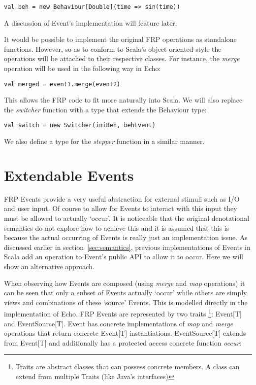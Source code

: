 \begin{verbatim}
val beh = new Behaviour[Double](time => sin(time))
\end{verbatim}  

    A discussion of Event's implementation will feature later.
    
    It would be possible to implement the original FRP operations as standalone functions. However, so
    as to conform to Scala's object oriented style the operations will be attached to their respective
    classes. For instance, the \emph{merge} operation will be used in the following way in Echo:
    
\begin{verbatim}
val merged = event1.merge(event2)
\end{verbatim}

  This allows the FRP code to fit more naturally into Scala. We will also replace the \emph{switcher} function
  with a type that extends the Behaviour type:
  
\begin{verbatim}
val switch = new Switcher(iniBeh, behEvent)
\end{verbatim}

  We also define a type for the \emph{stepper} function in a similar manner.
  
  \section{Extendable Events}
    FRP Events provide a very useful abstraction for external stimuli such as I/O and user input. Of course
    to allow for Events to interact with this input they must be allowed to actually `occur'.
    It is noticeable that the original denotational semantics \cite{Elliott1997} do not explore how to achieve
    this and it is assumed that this is because the actual occurring of Events is really just an implementation
    issue. As discussed earlier in section~\ref{sec:semantics}, previous implementations of Events in Scala add an operation to Event's
    public API to allow it to occur. Here we will show an alternative approach.
    
    When observing how Events are composed (using \emph{merge} and \emph{map} operations) it can be seen that
    only a subset of Events actually `occur' while others are simply views and combinations of these `source' Events.
    This is modelled directly in the implementation of Echo. FRP Events are represented by two traits \footnote{Traits are abstract
    classes that can possess concrete members. A class can extend from multiple Traits (like Java's interfaces)}: 
    Event[T] and EventSource[T].
    Event has concrete implementations of \emph{map} and \emph{merge} operations that
    return concrete Event[T] instantiations. EventSource[T] extends
    from Event[T] and additionally has a protected access concrete function \emph{occur}:
    
